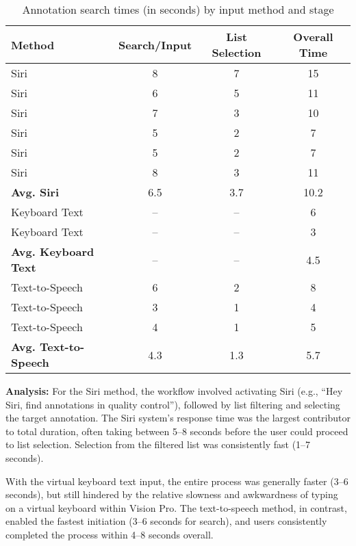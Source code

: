 \begin{table}[h!]
    \centering
    \caption{Annotation search times (in seconds) by input method and stage}
    \label{tab:annotation_accuracy_breakdown}
    \begin{tabular}{|l|c|c|c|}
        \hline
        \textbf{Method} & \textbf{Search/Input} & \textbf{List Selection} & \textbf{Overall Time} \\
        \hline
        Siri & 8 & 7 & 15 \\
        Siri & 6 & 5 & 11 \\
        Siri & 7 & 3 & 10 \\
        Siri & 5 & 2 & 7 \\
        Siri & 5 & 2 & 7 \\
        Siri & 8 & 3 & 11 \\
        \hline
        \textbf{Avg. Siri} & 6.5 & 3.7 & 10.2 \\
        \hline
        Keyboard Text & -- & -- & 6 \\
        Keyboard Text & -- & -- & 3 \\
        \hline
        \textbf{Avg. Keyboard Text} & -- & -- & 4.5 \\
        \hline
        Text-to-Speech & 6 & 2 & 8 \\
        Text-to-Speech & 3 & 1 & 4 \\
        Text-to-Speech & 4 & 1 & 5 \\
        \hline
        \textbf{Avg. Text-to-Speech} & 4.3 & 1.3 & 5.7 \\
        \hline
    \end{tabular}
\end{table}

\noindent
\textbf{Analysis:} For the Siri method, the workflow involved activating Siri (e.g., “Hey Siri, find annotations in quality control”), followed by list filtering and selecting the target annotation. The Siri system’s response time was the largest contributor to total duration, often taking between 5–8 seconds before the user could proceed to list selection. Selection from the filtered list was consistently fast (1–7 seconds). 

With the virtual keyboard text input, the entire process was generally faster (3–6 seconds), but still hindered by the relative slowness and awkwardness of typing on a virtual keyboard within Vision Pro. The text-to-speech method, in contrast, enabled the fastest initiation (3–6 seconds for search), and users consistently completed the process within 4–8 seconds overall.


